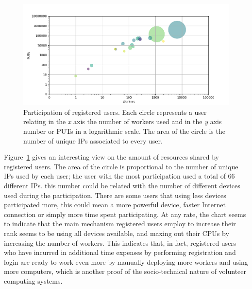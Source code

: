 \documentclass{llncs}
\begin{document}
%
\begin{figure}[htb]
    \centering
        \includegraphics[width=5.3in]{img/workers_put_ip.png}
    \caption{ Participation of registered users. Each circle represents a user relating
        in the \emph{x} axis the number of workers used and in the \emph{y} axis
        number or PUTs in a logarithmic scale. The area of the circle is the number
        of unique IPs associated to every user. 
    }
    \label{fig:worker-put-ips}
\end{figure}
%
Figure~\ref{fig:worker-put-ips} gives an interesting view on the amount of
resources shared by registered users. The area of the circle is proportional
to the number of unique IPs used by each user; the user with the most participation
used a total of 66 different IPs. this number could be related with the number
of different devices used during the participation. There are some users that using less
devices participated more, this could mean a more powerful device, faster
Internet connection or simply more time spent participating. At any
rate, the chart seems to indicate that the main mechanism registered
users employ to increase their rank seems to be using all devices
available, and maxing out their CPUs by increasing the number of
workers. This indicates that, in fact, registered users who have
incurred in additional time expenses by performing registration and
login are ready to work even more by manually deploying more workers
and using more computers, which is another proof of the
socio-technical nature of volunteer computing systems. 
\end{document}
